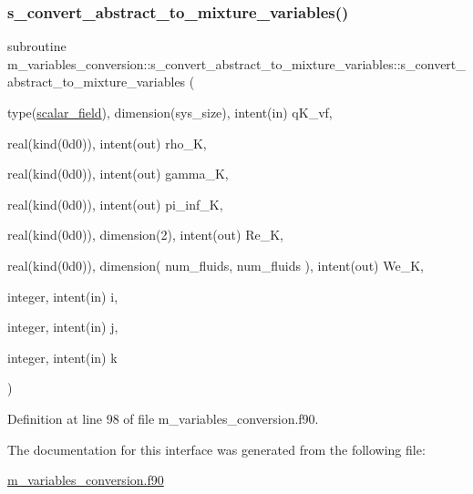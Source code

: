 \subsubsection{\texorpdfstring{s\+\_\+convert\+\_\+abstract\+\_\+to\+\_\+mixture\+\_\+variables()}{s\_convert\_abstract\_to\_mixture\_variables()}}
{\footnotesize\ttfamily subroutine m\+\_\+variables\+\_\+conversion\+::s\+\_\+convert\+\_\+abstract\+\_\+to\+\_\+mixture\+\_\+variables\+::s\+\_\+convert\+\_\+abstract\+\_\+to\+\_\+mixture\+\_\+variables (\begin{DoxyParamCaption}\item[{type(\hyperlink{structm__derived__types_1_1scalar__field}{scalar\+\_\+field}), dimension(sys\+\_\+size), intent(in)}]{q\+K\+\_\+vf,  }\item[{real(kind(0d0)), intent(out)}]{rho\+\_\+K,  }\item[{real(kind(0d0)), intent(out)}]{gamma\+\_\+K,  }\item[{real(kind(0d0)), intent(out)}]{pi\+\_\+inf\+\_\+K,  }\item[{real(kind(0d0)), dimension(2), intent(out)}]{Re\+\_\+K,  }\item[{real(kind(0d0)), dimension( num\+\_\+fluids,                                         num\+\_\+fluids  ), intent(out)}]{We\+\_\+K,  }\item[{integer, intent(in)}]{i,  }\item[{integer, intent(in)}]{j,  }\item[{integer, intent(in)}]{k }\end{DoxyParamCaption})}



Definition at line 98 of file m\+\_\+variables\+\_\+conversion.\+f90.



The documentation for this interface was generated from the following file\+:\begin{DoxyCompactItemize}
\item 
\hyperlink{m__variables__conversion_8f90}{m\+\_\+variables\+\_\+conversion.\+f90}\end{DoxyCompactItemize}
